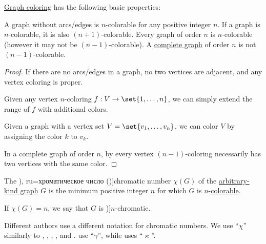 \begin{proposition}\label{thm:def:graph_coloring}
  \hyperref[def:n_partite_graph]{Graph coloring} has the following basic properties:
  \begin{thmenum}
     A graph without arcs/edges is \( n \)-colorable for any positive integer \( n \).
     If a graph is \( n \)-colorable, it is also \( (n + 1) \)-colorable.
     Every graph of order \( n \) is \( n \)-colorable (however it may not be \( (n - 1) \)-colorable).
     A \hyperref[def:complete_graph]{complete graph} of order \( n \) is not \( (n - 1) \)-colorable.
  \end{thmenum}
\end{proposition}
\begin{proof}
   If there are no arcs/edges in a graph, no two vertices are adjacent, and any vertex coloring is proper.

   Given any vertex \( n \)-coloring \( f: V \to \set{ 1, \ldots, n } \), we can simply extend the range of \( f \) with additional colors.

   Given a graph with a vertex set \( V = \set{ v_1, \ldots, v_n } \), we can color \( V \) by assigning the color \( k \) to \( v_k \).

   In a complete graph of order \( n \), by  every vertex \( (n - 1) \)-coloring necessarily has two vertices with the same color.
\end{proof}

\begin{definition}\label{def:chromatic_number}
  The \term[bg=хроматично число (\cite[142]{Мирчев2001}), ru=хроматическое число (\cite[235]{Емеличев1990})]{chromatic number} \( \chi(G) \) of the \hyperref[rem:arbitrary_kind_graph]{arbitrary-kind graph} \( G \) is the minimum positive integer \( n \) for which \( G \) is \( n \)-\hyperref[def:graph_coloring/colorable]{colorable}.

  If \( \chi(G) = n \), we say that \( G \) is \term[ru=\( n \)-хроматический (граф) (\cite[236]{Емеличев1990})]{\( n \)-chromatic}.
\end{definition}
\begin{comments}
  \item Different authors use a different notation for chromatic numbers. We use \enquote{\( \chi \)} similarly to , , , ,  and .  use \enquote{\( \gamma \)}, while  uses \enquote{\( \varkappa \)}.
\end{comments}

